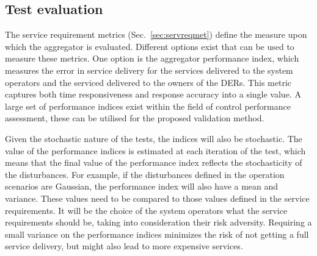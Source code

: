 


\subsection{Test evaluation}\label{sec:evaluation}
The service requirement metrics (Sec.~\ref{sec:servreqmet}) define the measure upon which the aggregator is evaluated. Different options exist that can be used to measure these metrics. One option is the aggregator performance index, which measures the error in service delivery for the services delivered to the system operators and the serviced delivered to the owners of the DERs. This metric captures both time responsiveness and response accuracy into a single value. A large set of performance indices exist within the field of control performance assessment, these can be utilised for the proposed validation method.

Given the stochastic nature of the tests, the indices will also be stochastic. The value of the performance indices is estimated at each iteration of the test, which means that the final value of the performance index reflects the stochasticity of the disturbances. For example, if the disturbances defined in the operation scenarios are Gaussian, the performance index will also have a mean and variance. These values need to be compared to those values defined in the service requirements. It will be the choice of the system operators what the service requirements should be, taking into consideration their risk adversity. Requiring a small variance on the performance indices minimizes the risk of not getting a full service delivery, but might also lead to more expensive services.

